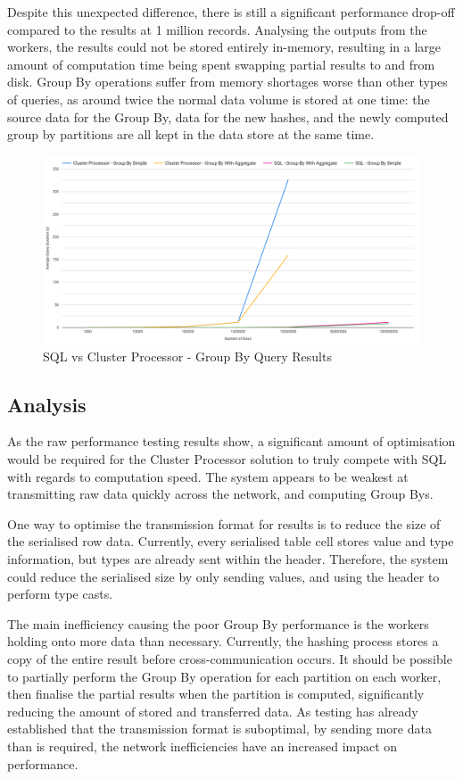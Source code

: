 Despite this unexpected difference, there is still a significant performance drop-off compared to the results at 1 million records. Analysing the outputs from the workers, the results could not be stored entirely in-memory, resulting in a large amount of computation time being spent swapping partial results to and from disk. Group By operations suffer from memory shortages worse than other types of queries, as around twice the normal data volume is stored at one time: the source data for the Group By, data for the new hashes, and the newly computed group by partitions are all kept in the data store at the same time.

\begin{figure}[htp]
	\centering
	\includegraphics[width=0.8\linewidth]{chapters/diagrams/testing/group-by-1k-100m}
	\caption{SQL vs Cluster Processor - Group By Query Results}
	\label{fig:group-by-graph}
\end{figure}

\subsection{Analysis}\label{subsec:sql-cluster-processor-analysis}
As the raw performance testing results show, a significant amount of optimisation would be required for the Cluster Processor solution to truly compete with SQL with regards to computation speed. The system appears to be weakest at transmitting raw data quickly across the network, and computing Group Bys.

One way to optimise the transmission format for results is to reduce the size of the serialised row data. Currently, every serialised table cell stores value and type information, but types are already sent within the header. Therefore, the system could reduce the serialised size by only sending values, and using the header to perform type casts.

The main inefficiency causing the poor Group By performance is the workers holding onto more data than necessary. Currently, the hashing process stores a copy of the entire result before cross-communication occurs. It should be possible to partially perform the Group By operation for each partition on each worker, then finalise the partial results when the partition is computed, significantly reducing the amount of stored and transferred data. As testing has already established that the transmission format is suboptimal, by sending more data than is required, the network inefficiencies have an increased impact on performance. 

